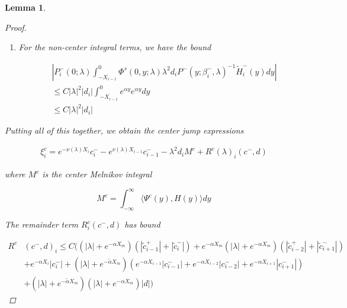 \documentclass[12pt]{article}
\newtheorem{lemma}{Lemma}
\begin{document}
\begin{lemma}
\begin{proof}
\begin{enumerate}
\begin{align*}
&|(P_i^-(0; \lambda) - P^-(0))b_i^- + P_i^-(0; \lambda)(P_0^u(\lambda) - P_0^u(0))b_i^-| \\
&\leq C(|\lambda| + e^{-\alpha X_m}) |B_1(c, \tilde{c}, d)| \\
&\leq C(|\lambda| + e^{-\alpha X_m}) \Big( 
(|\lambda| + e^{-\tilde{\alpha}X_m})( |\tilde{c}_{i-1}^+| + |\tilde{c}_i^-|)
+ e^{-\tilde{\alpha} X_{i-1}} |c_{i-1}^-| + e^{-\tilde{\alpha} X_i} |c_i^-| + ( e^{-\tilde{\alpha}X_m} |D| + e^{-\tilde{\alpha}X_m}|\lambda| + |\lambda|^2)|d| \Big)
\end{align*}

\item For the non-center integral terms, we have the bound

\begin{align*}
&\left| P_i^-(0; \lambda) 
\int_{-X_{i-1}}^0 \Phi^s(0, y; \lambda) \lambda^2 d_i P^-(y; \beta_i^-, \lambda)^{-1} \tilde{H}_i^-(y) dy \right| \\
&\leq C |\lambda|^2 |d_i| \int_{-X_{i-1}}^0 e^{\alpha y} e^{\alpha y} dy \\
&\leq C |\lambda|^2 |d_i|
\end{align*}

\end{enumerate}

Putting all of this together, we obtain the center jump expressions

\begin{align*}
\xi^c_i = e^{-\nu(\lambda) X_i} c_i^- - e^{\nu(\lambda) X_{i-1}} c_{i-1}^- - \lambda^2 d_i M^c + R^c(\lambda)_i(c^-, d)
\end{align*}

where $M^c$ is the center Melnikov integral

\[
M^c = \int_{-\infty}^\infty \langle \Psi^c(y), H(y) \rangle dy 
\]

The remainder term $R^c_i(c^-, d)$ has bound

\begin{align*}
R^c&(c^-, d)_i \leq C \Big(
(|\lambda| + e^{-\alpha X_m})(|\tilde{c}_{i-1}^+| + |\tilde{c}_{i}^-|) + e^{-\alpha X_m}(|\lambda| + e^{-\alpha X_m})( |\tilde{c}_{i-2}^+| + |\tilde{c}_{i+1}^-|)  \\
&+ e^{-\alpha X_i} |c_i^-| + (|\lambda| + e^{-\tilde{\alpha} X_m})( e^{-\alpha X_{i-1}} |c_{i-1}^-| + e^{-\alpha X_{i-2}} |c_{i-2}^-| + e^{-\alpha X_{i+1}} |c_{i+1}^-|) \\
&+ (|\lambda| + e^{-\tilde{\alpha} X_m})(|\lambda| + e^{-\alpha X_m})|d|
\Big)
\end{align*}


\end{proof}
\end{lemma}
\end{document}
